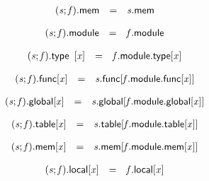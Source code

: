 $$
\begin{array}{@{}lcl@{}l@{}}
({\mathit{s}} ; {\mathit{f}}).\mathsf{mem} &=& {\mathit{s}}.\mathsf{mem} &  \\
\end{array}
$$

$$
\begin{array}{@{}lcl@{}l@{}}
({\mathit{s}} ; {\mathit{f}}).\mathsf{module} &=& {\mathit{f}}.\mathsf{module} &  \\
\end{array}
$$

$$
\begin{array}{@{}lcl@{}l@{}}
({\mathit{s}} ; {\mathit{f}}).\mathsf{type}~\,{}[{\mathit{x}}] &=& {\mathit{f}}.\mathsf{module}.\mathsf{type}{}[{\mathit{x}}] &  \\
\end{array}
$$

$$
\begin{array}{@{}lcl@{}l@{}}
{({\mathit{s}} ; {\mathit{f}}).\mathsf{func}}{{}[{\mathit{x}}]} &=& {\mathit{s}}.\mathsf{func}{}[{\mathit{f}}.\mathsf{module}.\mathsf{func}{}[{\mathit{x}}]] &  \\
\end{array}
$$

$$
\begin{array}{@{}lcl@{}l@{}}
{({\mathit{s}} ; {\mathit{f}}).\mathsf{global}}{{}[{\mathit{x}}]} &=& {\mathit{s}}.\mathsf{global}{}[{\mathit{f}}.\mathsf{module}.\mathsf{global}{}[{\mathit{x}}]] &  \\
\end{array}
$$

$$
\begin{array}{@{}lcl@{}l@{}}
{({\mathit{s}} ; {\mathit{f}}).\mathsf{table}}{{}[{\mathit{x}}]} &=& {\mathit{s}}.\mathsf{table}{}[{\mathit{f}}.\mathsf{module}.\mathsf{table}{}[{\mathit{x}}]] &  \\
\end{array}
$$

$$
\begin{array}{@{}lcl@{}l@{}}
{({\mathit{s}} ; {\mathit{f}}).\mathsf{mem}}{{}[{\mathit{x}}]} &=& {\mathit{s}}.\mathsf{mem}{}[{\mathit{f}}.\mathsf{module}.\mathsf{mem}{}[{\mathit{x}}]] &  \\
\end{array}
$$

$$
\begin{array}{@{}lcl@{}l@{}}
{({\mathit{s}} ; {\mathit{f}}).\mathsf{local}}{{}[{\mathit{x}}]} &=& {\mathit{f}}.\mathsf{local}{}[{\mathit{x}}] &  \\
\end{array}
$$

